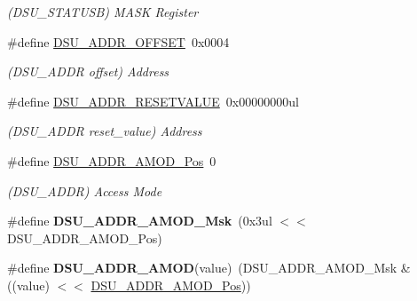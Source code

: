 \begin{DoxyCompactItemize}
\begin{DoxyCompactList}\small\item\em (D\+S\+U\+\_\+\+S\+T\+A\+T\+U\+S\+B) M\+A\+S\+K Register \end{DoxyCompactList}\item 
\hypertarget{group___s_a_m_l21___d_s_u_gabf4bde31f974267a5be16e838fb4c385}{}\#define \hyperlink{group___s_a_m_l21___d_s_u_gabf4bde31f974267a5be16e838fb4c385}{D\+S\+U\+\_\+\+A\+D\+D\+R\+\_\+\+O\+F\+F\+S\+E\+T}~0x0004\label{group___s_a_m_l21___d_s_u_gabf4bde31f974267a5be16e838fb4c385}

\begin{DoxyCompactList}\small\item\em (D\+S\+U\+\_\+\+A\+D\+D\+R offset) Address \end{DoxyCompactList}\item 
\hypertarget{group___s_a_m_l21___d_s_u_ga20348917b1dead19b4cf118c7470c2e4}{}\#define \hyperlink{group___s_a_m_l21___d_s_u_ga20348917b1dead19b4cf118c7470c2e4}{D\+S\+U\+\_\+\+A\+D\+D\+R\+\_\+\+R\+E\+S\+E\+T\+V\+A\+L\+U\+E}~0x00000000ul\label{group___s_a_m_l21___d_s_u_ga20348917b1dead19b4cf118c7470c2e4}

\begin{DoxyCompactList}\small\item\em (D\+S\+U\+\_\+\+A\+D\+D\+R reset\+\_\+value) Address \end{DoxyCompactList}\item 
\hypertarget{group___s_a_m_l21___d_s_u_gad4121595b48dfe29aaec9b674634bc57}{}\#define \hyperlink{group___s_a_m_l21___d_s_u_gad4121595b48dfe29aaec9b674634bc57}{D\+S\+U\+\_\+\+A\+D\+D\+R\+\_\+\+A\+M\+O\+D\+\_\+\+Pos}~0\label{group___s_a_m_l21___d_s_u_gad4121595b48dfe29aaec9b674634bc57}

\begin{DoxyCompactList}\small\item\em (D\+S\+U\+\_\+\+A\+D\+D\+R) Access Mode \end{DoxyCompactList}\item 
\hypertarget{group___s_a_m_l21___d_s_u_ga977bea859b9813e830d1993d5cd0ff86}{}\#define {\bfseries D\+S\+U\+\_\+\+A\+D\+D\+R\+\_\+\+A\+M\+O\+D\+\_\+\+Msk}~(0x3ul $<$$<$ D\+S\+U\+\_\+\+A\+D\+D\+R\+\_\+\+A\+M\+O\+D\+\_\+\+Pos)\label{group___s_a_m_l21___d_s_u_ga977bea859b9813e830d1993d5cd0ff86}

\item 
\hypertarget{group___s_a_m_l21___d_s_u_gac53e3c3b1ad8d530a190d066ae1396e3}{}\#define {\bfseries D\+S\+U\+\_\+\+A\+D\+D\+R\+\_\+\+A\+M\+O\+D}(value)~(D\+S\+U\+\_\+\+A\+D\+D\+R\+\_\+\+A\+M\+O\+D\+\_\+\+Msk \& ((value) $<$$<$ \hyperlink{group___s_a_m_l21___d_s_u_gad4121595b48dfe29aaec9b674634bc57}{D\+S\+U\+\_\+\+A\+D\+D\+R\+\_\+\+A\+M\+O\+D\+\_\+\+Pos}))\label{group___s_a_m_l21___d_s_u_gac53e3c3b1ad8d530a190d066ae1396e3}


\end{DoxyCompactItemize}
